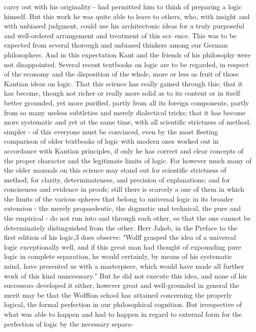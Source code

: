 carry out with his originality - had permitted him to think of preparing a
logic himself. But this work he was quite able to leave to others, who, with
insight and with unbiased judgment, could use his architectonic ideas for a
truly purposeful and well-ordered arrangement and treatment of this sci-
ence. This was to be expected from several thorough and unbiased thinkers
among our German philosophers. And in this expectation Kant and the
friends of his philosophy were not disappointed. Several recent textbooks
on logic are to be regarded, in respect of the economy and the disposition of
the whole, more or less as fruit of those Kantian ideas on logic. That this
science has really gained through this; that it has become, though not richer
or really more solid as to its content or in itself better grounded, yet more
purified, partly from all its foreign components, partly from so many useless
subtleties and merely dialectical tricks; that it has become more systematic
and yet at the same time, with all scientific strictness of method, simpler - of
this everyone must be convinced, even by the most fleeting comparison of
older textbooks of logic with modern ones worked out in accordance with
Kantian principles, if only he has correct and clear concepts of the proper
character and the legitimate limits of logic. For however much many of the
older manuals on this science may stand out for scientific strictness of
method; for clarity, determinateness, and precision of explanations; and for
conciseness and evidence in proofs; still there is scarcely a one of them in
which the limits of the various spheres that belong to universal logic in its
broader extension - the merely propaedeutic, the dogmatic und technical, the
pure and the empirical - do not run into and through each other, so that the
one cannot be determinately distinguished from the other.
Herr Jakob, in the Preface to the first edition of his logic,3 does observe:
"Wolff grasped the idea of a universal logic exceptionally well, and if this
great man had thought of expounding pure logic in complete separation,
he would certainly, by means of his systematic mind, have presented us
with a masterpiece, which would have made all further work of this kind
unnecessary." But he did not execute this idea, and none of his successors
developed it either, however great and well-grounded in general the merit
may be that the Wolffian school has attained concerning the properly
logical, the formal perfection in our philosophical cognition.
But irrespective of what was able to happen and had to happen in
regard to external form for the perfection of logic by the necessary separa-
